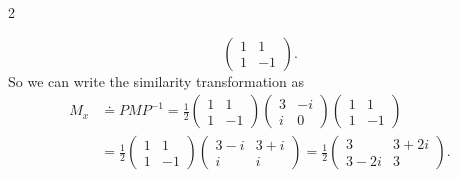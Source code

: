 \documentclass[11pt]{article}
\begin{document}
\begin{problem}{2}
\begin{enumerate}[label=(\alph*)]
\begin{answer}
\begin{equation}
\begin{pmatrix}
1  & 1 \\
1  & -1
 \end{pmatrix}.
\end{equation}
So we can write the similarity transformation as
\begin{equation}
\label{eq:21}
  \begin{aligned}
M_x &\doteq P M P^{-1} = \frac{1}{2} \begin{pmatrix}
1  & 1 \\
1  & -1
 \end{pmatrix} \begin{pmatrix}
3  & -i \\
i  & 0
 \end{pmatrix} \begin{pmatrix}
1  & 1 \\
1  & -1
 \end{pmatrix} \\
    &= \frac{1}{2} \begin{pmatrix}
1  & 1 \\
1  & -1
 \end{pmatrix} \begin{pmatrix}
3-i      & 3+i \\
i        & i
 \end{pmatrix} = \frac{1}{2} \begin{pmatrix}
3        & 3+2i \\
3-2i     & 3
 \end{pmatrix}.
 \end{aligned}
\end{equation}
          \end{answer}
  \end{enumerate}
\end{problem}
\end{document}
